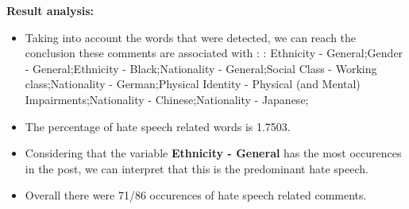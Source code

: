 \documentclass[11pt]{article}
\begin{document}
\textbf{\Large Result analysis:}

\begin{itemize}\item Taking into account the words that were detected, we can reach the conclusion these comments are associated with : : Ethnicity - General;Gender - General;Ethnicity - Black;Nationality - General;Social Class - Working class;Nationality - German;Physical Identity - Physical (and Mental) Impairments;Nationality - Chinese;Nationality - Japanese;%

\item The percentage of hate speech related words is 1.7503.

\item Considering that the variable \textbf{Ethnicity - General} has the most occurences in the post, we can interpret that this is the predominant hate speech.

\item Overall there were 71/86 occurences of hate speech related comments.\end{itemize}
\end{document}
